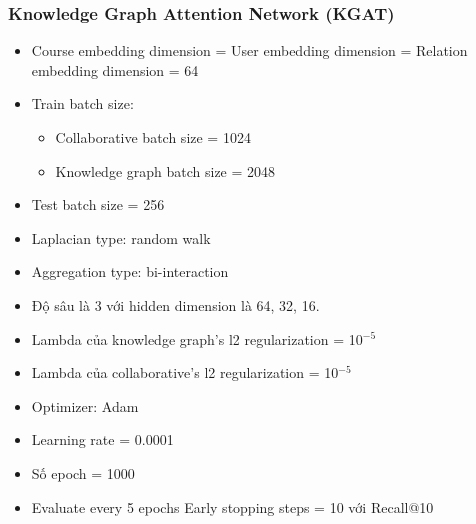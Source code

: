 \subsubsection{Knowledge Graph Attention Network (KGAT)}
\begin{itemize}
    \item Course embedding dimension = User embedding dimension = Relation embedding dimension = 64
    \item Train batch size:
    \begin{itemize}
        \item Collaborative batch size = 1024
        \item Knowledge graph batch size = 2048
    \end{itemize}
    \item Test batch size = 256
    \item Laplacian type: random walk
    \item Aggregation type: bi-interaction
    \item Độ sâu là 3 với hidden dimension là 64, 32, 16.
    \item Lambda của knowledge graph’s l2 regularization = 10$^{-5}$
    \item Lambda của collaborative’s l2 regularization = 10$^{-5}$
    \item Optimizer: Adam
    \item Learning rate = 0.0001
    \item Số epoch = 1000
    \item Evaluate every 5 epochs Early stopping steps = 10 với Recall@10
\end{itemize}
